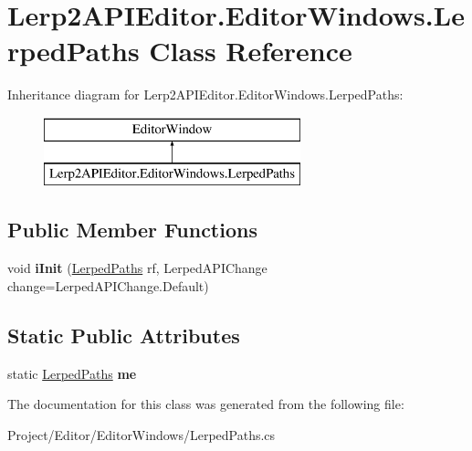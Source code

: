 \hypertarget{class_lerp2_a_p_i_editor_1_1_editor_windows_1_1_lerped_paths}{}\section{Lerp2\+A\+P\+I\+Editor.\+Editor\+Windows.\+Lerped\+Paths Class Reference}
\label{class_lerp2_a_p_i_editor_1_1_editor_windows_1_1_lerped_paths}
Inheritance diagram for Lerp2\+A\+P\+I\+Editor.\+Editor\+Windows.\+Lerped\+Paths\+:\begin{figure}[H]
\begin{center}
\leavevmode
\includegraphics[height=2.000000cm]{class_lerp2_a_p_i_editor_1_1_editor_windows_1_1_lerped_paths}
\end{center}
\end{figure}
\subsection*{Public Member Functions}
\begin{DoxyCompactItemize}
\item 
\mbox{\label{class_lerp2_a_p_i_editor_1_1_editor_windows_1_1_lerped_paths_a7ff1e54adacf9f29a9bacd78f1c9d6ae}} 
void {\bfseries i\+Init} (\hyperlink{class_lerp2_a_p_i_editor_1_1_editor_windows_1_1_lerped_paths}{Lerped\+Paths} rf, Lerped\+A\+P\+I\+Change change=Lerped\+A\+P\+I\+Change.\+Default)
\end{DoxyCompactItemize}
\subsection*{Static Public Attributes}
\begin{DoxyCompactItemize}
\item 
\mbox{\label{class_lerp2_a_p_i_editor_1_1_editor_windows_1_1_lerped_paths_a1160b7dd1dd73b5d2c1fce6752f38bd0}} 
static \hyperlink{class_lerp2_a_p_i_editor_1_1_editor_windows_1_1_lerped_paths}{Lerped\+Paths} {\bfseries me}
\end{DoxyCompactItemize}


The documentation for this class was generated from the following file\+:\begin{DoxyCompactItemize}
\item 
Project/\+Editor/\+Editor\+Windows/Lerped\+Paths.\+cs\end{DoxyCompactItemize}
